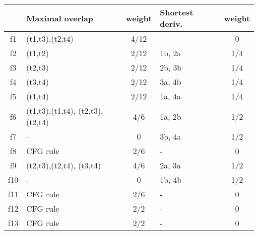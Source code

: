 \begin{tabular}{c|p{}c|p{}c|}
&Maximal overlap&weight&Shortest deriv.\footnotemark&weight\\\hline
f1&(t1,t3),(t2,t4)&4/12&-&0\\
f2&(t1,t2)&2/12&1b, 2a&1/4\\
f3&(t2,t3)&2/12&2b, 3b&1/4\\
f4&(t3,t4)&2/12&3a, 4b&1/4\\
f5&(t1,t4)&2/12&1a, 4a&1/4\\
f6&(t1,t3),(t1,t4), (t2,t3),(t2,t4)&4/6&1a, 2b&1/2\\
f7&-&0&3b, 4a&1/2\\
f8&CFG rule&2/6&-&0\\
f9&(t2,t3),(t2,t4), (t3,t4)&4/6&2a, 3a&1/2\\
f10&-&0&1b, 4b&1/2\\
f11&CFG rule&2/6&-&0\\
f12&CFG rule&2/2&-&0\\
f13&CFG rule&2/2&-&0\\
\end{tabular}

